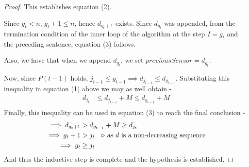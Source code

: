 \documentclass[answers]{exam}
\begin{document}
\begin{questions}
\begin{parts}
\begin{solution}
\begin{proof}
    This establishes equation (2).
    
    Since ${g_t} < n$, $g_t + 1 \le n$, hence $d_{g_t + 1}$ exists.
    Since $d_{g_t}$ was appended, from the termination condition of the inner loop of the algorithm at the step $I=g_t$ and the preceding sentence, equation (3) follows.
    
    Also, we have that when we append $d_{g_t}$, we set $previousSensor = d_{g_t}$.
    
    Now, since $P(t-1)$ holds, $j_{t-1} \leq g_{t-1} \implies d_{j_{t-1}} \leq d_{g_{t-1}}$. Substituting this inequality in equation (1) above we may as well obtain -
    \begin{align*}
        d_{j_t} &\leq d_{j_{t-1}} + M \leq d_{g_{t-1}} + M \\
    \end{align*}
    Finally, this inequality can be used in equation (3) to reach the final conclusion -
    \begin{align*}
        \implies d_{g_t + 1} &> d_{g_{t - 1}} + M \ge d_{j_t} \\
        \implies g_t + 1 &> j_t \quad\text{\Comment{as $d$ is a non-decreasing sequence}}\\
        \implies g_t &\geq j_t
    \end{align*}
    And thus the inductive step is complete and the hypothesis is established.
\end{proof}
\end{solution}


\end{parts}
\end{questions}
\end{document}

